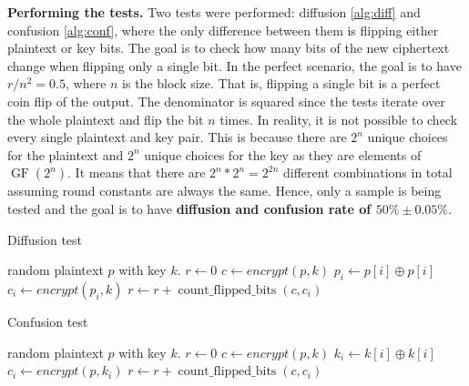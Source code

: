 \documentclass{Resources/UoBLab1}
\theoremstyle{definition}
\begin{document}
\noindent\textbf{Performing the tests.} Two tests were performed: diffusion \ref{alg:diff} and confusion \ref{alg:conf}, where the only difference between them is flipping either plaintext or key bits. The goal is to check how many bits of the new ciphertext change when flipping only a single bit. In the perfect scenario, the goal is to have \(r / n^2 = 0.5\), where $n$ is the block size. That is, flipping a single bit is a perfect coin flip of the output. The denominator is squared since the tests iterate over the whole plaintext and flip the bit $n$ times. In reality, it is not possible to check every single plaintext and key pair. This is because there are $2^n$ unique choices for the plaintext and $2^n$ unique choices for the key as they are elements of $\operatorname{GF}(2^n)$. It means that there are \(2^n*2^n = 2^{2n}\) different combinations in total assuming round constants are always the same. Hence, only a sample is being tested and the goal is to have \textbf{diffusion and confusion rate of $ 50\% \pm 0.05\%$}.

\begin{minipage}{0.46\textwidth}
\begin{algorithm}[H]
    \caption{Diffusion test}\label{alg:diff}
    \begin{algorithmic}
        \Require random plaintext $p$ with key $k$.
        \State $r \gets 0$
        \State $c \gets encrypt(p, k)$
            \State $p_i \gets p[i] \oplus p[i]$ 
            \State $c_i \gets encrypt(p_i, k)$
            \State $r \gets r + \operatorname{count\_flipped\_bits}(c, c_i)$
        \EndFor
    \end{algorithmic}
\end{algorithm}
\end{minipage}
\hfill
\begin{minipage}{0.46\textwidth}
\begin{algorithm}[H]
    \caption{Confusion test}\label{alg:conf}
    \begin{algorithmic}
        \Require random plaintext $p$ with key $k$.
        \State $r \gets 0$
        \State $c \gets encrypt(p, k)$
            \State $k_i \gets k[i] \oplus k[i]$ 
            \State $c_i \gets encrypt(p, k_i)$
            \State $r \gets r + \operatorname{count\_flipped\_bits}(c, c_i)$
        \EndFor
    \end{algorithmic}
\end{algorithm}
\end{minipage}
\end{document}
